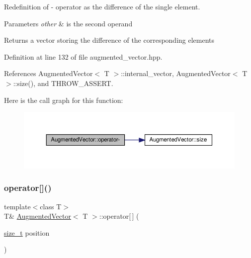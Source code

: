 Redefinition of -\/ operator as the difference of the single element. 


\begin{DoxyParams}{Parameters}
{\em other} & is the second operand \\
\hline
\end{DoxyParams}
\begin{DoxyReturn}{Returns}
a vector storing the difference of the corresponding elements 
\end{DoxyReturn}


Definition at line 132 of file augmented\+\_\+vector.\+hpp.



References Augmented\+Vector$<$ T $>$\+::internal\+\_\+vector, Augmented\+Vector$<$ T $>$\+::size(), and T\+H\+R\+O\+W\+\_\+\+A\+S\+S\+E\+RT.

Here is the call graph for this function\+:
\nopagebreak
\begin{figure}[H]
\begin{center}
\leavevmode
\includegraphics[width=350pt]{d1/d7a/classAugmentedVector_a70155aea13012d13bbef754d4b379a6d_cgraph}
\end{center}
\end{figure}
\mbox{\label{classAugmentedVector_a2a7ea60bb1f83ef00512368c4a929dd9}} 
\subsubsection{\texorpdfstring{operator[]()}{operator[]()}\hspace{0.1cm}{\footnotesize\ttfamily [1/2]}}
{\footnotesize\ttfamily template$<$class T$>$ \\
T\& \hyperlink{classAugmentedVector}{Augmented\+Vector}$<$ T $>$\+::operator\mbox{[}$\,$\mbox{]} (\begin{DoxyParamCaption}\item[{\hyperlink{tutorial__fpt__2017_2intro_2sixth_2test_8c_a7c94ea6f8948649f8d181ae55911eeaf}{size\+\_\+t}}]{position }\end{DoxyParamCaption})\hspace{0.3cm}{\ttfamily [inline]}}



